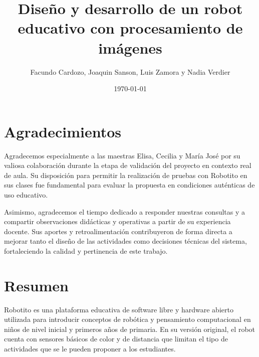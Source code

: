 \documentclass{prgrado}
\title{Diseño y desarrollo de un robot educativo con procesamiento de imágenes}
\author{Facundo Cardozo, Joaquin Sanson, Luis Zamora y Nadia Verdier}
\date{\today}
\begin{document}

\frontmatter %

\maketitle



\chapter*{Agradecimientos}

Agradecemos especialmente a las maestras Elisa, Cecilia y María José por su valiosa colaboración durante la etapa de validación del proyecto en contexto real de aula. Su disposición para permitir la realización de pruebas con Robotito en sus clases fue fundamental para evaluar la propuesta en condiciones auténticas de uso educativo.

Asimismo, agradecemos el tiempo dedicado a responder nuestras consultas y a compartir observaciones didácticas y operativas a partir de su experiencia docente. Sus aportes y retroalimentación contribuyeron de forma directa a mejorar tanto el diseño de las actividades como decisiones técnicas del sistema, fortaleciendo la calidad y pertinencia de este trabajo.




\chapter*{Resumen}

Robotito es una plataforma educativa de software libre y hardware abierto utilizada para introducir conceptos de robótica y pensamiento computacional en niños de nivel inicial y primeros años de primaria. En su versión original, el robot cuenta con sensores básicos de color y de distancia que limitan el tipo de actividades que se le pueden proponer a los estudiantes.
\end{document}
